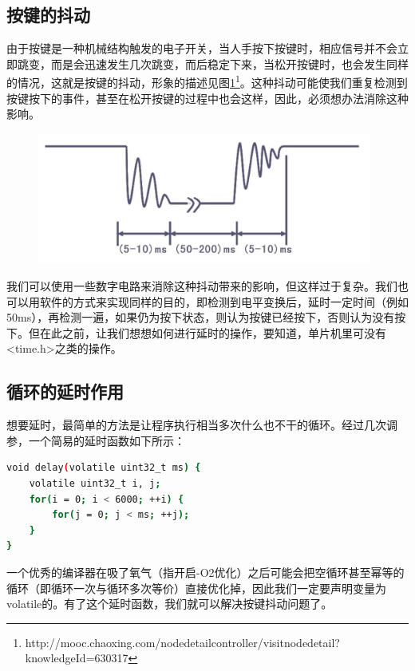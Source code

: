 	\subsection{按键的抖动}
		由于按键是一种机械结构触发的电子开关，当人手按下按键时，相应信号并不会立即跳变，而是会迅速发生几次跳变，而后稳定下来，当松开按键时，也会发生同样的情况，这就是按键的抖动，形象的描述见图\ref{fig:keyShake}\footnote{http://mooc.chaoxing.com/nodedetailcontroller/visitnodedetail?knowledgeId=630317}。这种抖动可能使我们重复检测到按键按下的事件，甚至在松开按键的过程中也会这样，因此，必须想办法消除这种影响。
		\begin{figure}[h]
			\begin{center}
				\includegraphics[width=110mm]{images/content/keyShake.jpg}
				\label{fig:keyShake}
			\end{center}
		\end{figure}
		\par 
		我们可以使用一些数字电路来消除这种抖动带来的影响，但这样过于复杂。我们也可以用软件的方式来实现同样的目的，即检测到电平变换后，延时一定时间（例如50ms），再检测一遍，如果仍为按下状态，则认为按键已经按下，否则认为没有按下。但在此之前，让我们想想如何进行延时的操作，要知道，单片机里可没有<time.h>之类的操作。
	
	\subsection{循环的延时作用}
	想要延时，最简单的方法是让程序执行相当多次什么也不干的循环。经过几次调参，一个简易的延时函数如下所示：
		\par 
		\begin{lstlisting}[language=bash, style=customStyleC, caption=简易延时函数]
void delay(volatile uint32_t ms) {
	volatile uint32_t i, j;
	for(i = 0; i < 6000; ++i) {
		for(j = 0; j < ms; ++j);
	}
}
		\end{lstlisting}
		\par 
		一个优秀的编译器在吸了氧气（指开启-O2优化）之后可能会把空循环甚至幂等的循环（即循环一次与循环多次等价）直接优化掉，因此我们一定要声明变量为volatile的。有了这个延时函数，我们就可以解决按键抖动问题了。
	
